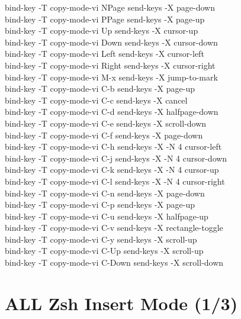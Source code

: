 \documentclass[11pt,a4paper,twoside]{book}
\begin{document}
bind-key  -T copy-mode-vi NPage  send-keys -X page-down\\
bind-key  -T copy-mode-vi PPage  send-keys -X page-up\\
bind-key  -T copy-mode-vi Up  send-keys -X cursor-up\\
bind-key  -T copy-mode-vi Down  send-keys -X cursor-down\\
bind-key  -T copy-mode-vi Left  send-keys -X cursor-left\\
bind-key  -T copy-mode-vi Right  send-keys -X cursor-right\\
bind-key  -T copy-mode-vi M-x  send-keys -X jump-to-mark\\
bind-key  -T copy-mode-vi C-b  send-keys -X page-up\\
bind-key  -T copy-mode-vi C-c  send-keys -X cancel\\
bind-key  -T copy-mode-vi C-d  send-keys -X halfpage-down\\
bind-key  -T copy-mode-vi C-e  send-keys -X scroll-down\\
bind-key  -T copy-mode-vi C-f  send-keys -X page-down\\
bind-key  -T copy-mode-vi C-h  send-keys -X -N 4 cursor-left\\
bind-key  -T copy-mode-vi C-j  send-keys -X -N 4 cursor-down\\
bind-key  -T copy-mode-vi C-k  send-keys -X -N 4 cursor-up\\
bind-key  -T copy-mode-vi C-l  send-keys -X -N 4 cursor-right\\
bind-key  -T copy-mode-vi C-n  send-keys -X page-down\\
bind-key  -T copy-mode-vi C-p  send-keys -X page-up\\
bind-key  -T copy-mode-vi C-u  send-keys -X halfpage-up\\
bind-key  -T copy-mode-vi C-v  send-keys -X rectangle-toggle\\
bind-key  -T copy-mode-vi C-y  send-keys -X scroll-up\\
bind-key  -T copy-mode-vi C-Up  send-keys -X scroll-up\\
bind-key  -T copy-mode-vi C-Down  send-keys -X scroll-down\\


\vspace{16pt}

\section{ALL Zsh Insert Mode (1/3)}
\end{document}
